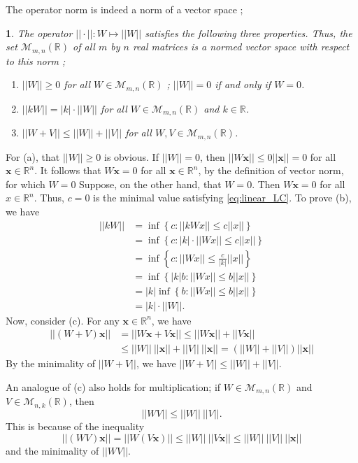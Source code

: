 \documentclass[12pt]{report}
\numberwithin{figure}{chapter}
\theoremstyle{plain}
\theoremstyle{definition}
\theoremstyle{corollary}
\theoremstyle{definition}
\theoremstyle{plain}
\newtheorem{proposition}[theorem]{\protect\propositionname}
\theoremstyle{definition}
\theoremstyle{plain}
\providecommand{\propositionname}{Proposition}
\newcommand\bx{\ensuremath{\boldsymbol x}}
\begin{document}
The operator norm is indeed a norm of a vector space ;
\begin{proposition}\label{prop:operator_norm_1}
The operator \(||\cdot||:W\mapsto||W||\) satisfies the following three properties.
Thus, the set \(\mathcal M_{m,n}(\mathbb R)\) of all \(m\) by \(n\) real matrices is a normed vector space with respect to this norm ;
\begin{enumerate}[label=(\alph*)]
\item
\(||W||\ge0\) for all \(W\in\mathcal M_{m,n}(\mathbb R)\) ; \(||W||=0\) if and only if \(W=0\).
\item
\(||kW||=|k|\cdot||W||\) for all \(W\in\mathcal M_{m,n}(\mathbb R)\) and \(k\in\mathbb R\).
\item
\(||W+V||\le||W||+||V||\) for all \(W,V\in\mathcal M_{m,n}(\mathbb R)\).
\end{enumerate}
\end{proposition}
For (a), that \(||W||\ge0\) is obvious.
If \(||W||=0\), then \(||W\bx||\le 0||\bx||=0\) for all \(\bx\in\mathbb R^n\).
It follows that \(W\bx=0\) for all \(\bx\in\mathbb R^n\), by the definition of vector norm, for which \(W=0\)
Suppose, on the other hand, that \(W=0\). Then \(W\bx=0\) for all \(x\in\mathbb R^n\).
Thus, \(c=0\) is the minimal value satisfying \eqref{eq:linear_LC}.
To prove (b), we have
\begin{align*}
||kW||
&=\inf\left\{c:||kWx||\le c||x||\right\}\\
&=\inf\left\{c:|k|\cdot||Wx||\le c||x||\right\}\\
&=\inf\left\{c:||Wx||\le\frac{c}{|k|}||x||\right\}\\
&=\inf\left\{|k|b:||Wx||\le b||x||\right\}\\
&=|k|\inf\left\{b:||Wx||\le b||x||\right\}\\
&=|k|\cdot||W||.
\end{align*}
Now, consider (c).
For any \(\bx\in\mathbb R^n\), we have
\begin{align*}
||(W+V)\bx||
&=||W\bx+V\bx||\le||W\bx||+||V\bx||\\
&\le||W||\:||\bx||+||V||\:||\bx||=(||W||+||V||)||\bx||
\end{align*}
By the minimality of \(||W+V||\), we have \(||W+V||\le||W||+||V||\).

An analogue of (c) also holds for multiplication;
if \(W\in\mathcal M_{m,n}(\mathbb R)\) and \(V\in\mathcal M_{n,k}(\mathbb R)\), then
\begin{equation}\label{eq:multiplicative_inequality}
||WV||\le||W||\:||V||.
\end{equation}
This is because of the inequality
\[||(WV)\bx||=||W(V\bx)||\le||W||\:||V\bx||\le||W||\:||V||\:||\bx||\]
and the minimality of \(||WV||\).
\end{document}
